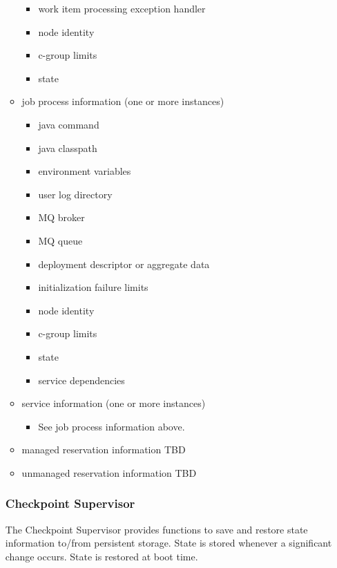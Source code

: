 \begin{itemize}
\begin{itemize}
\begin{itemize}
          \item work item processing exception handler
          \item node identity
          \item c-group limits
          \item state
        \end{itemize} 
      \item job process information (one or more instances)
        \begin{itemize}
          \item java command
          \item java classpath
          \item environment variables
          \item user log directory
          \item MQ broker
          \item MQ queue
          \item deployment descriptor or aggregate data
          \item initialization failure limits
          \item node identity
          \item c-group limits
          \item state
          \item service dependencies
        \end{itemize} 
      \item service information (one or more instances)
        \begin{itemize}
          \item See job process information above.
        \end{itemize} 
      \item managed reservation information
        TBD      
      \item unmanaged reservation information
        TBD          
    \end{itemize} 
    
    \subsubsection{Checkpoint Supervisor} 
    
    The Checkpoint Supervisor provides functions to save and restore state information
    to/from persistent storage. State is stored whenever a significant change occurs.
    State is restored at \varOrchestrator boot time.
    

\end{itemize}
